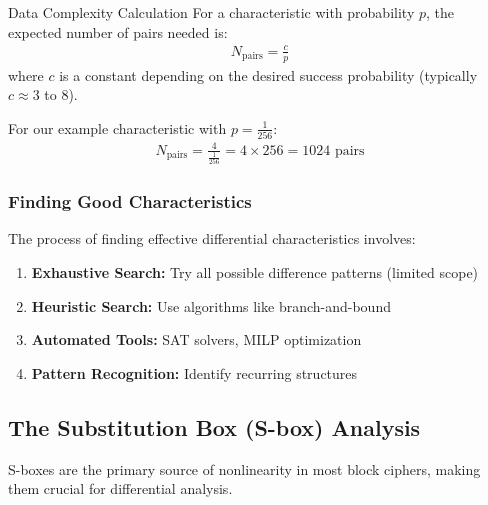 \documentclass[12pt,a4paper]{article}
\theoremstyle{definition}
\begin{document}
\begin{examplebox}{Data Complexity Calculation}
For a characteristic with probability $p$, the expected number of pairs needed is:
\begin{align}
N_{\text{pairs}} = \frac{c}{p}
\end{align}
where $c$ is a constant depending on the desired success probability (typically $c \approx 3$ to $8$).

For our example characteristic with $p = \frac{1}{256}$:
\begin{align}
N_{\text{pairs}} = \frac{4}{\frac{1}{256}} = 4 \times 256 = 1024 \text{ pairs}
\end{align}
\end{examplebox}

\subsubsection{Finding Good Characteristics}

The process of finding effective differential characteristics involves:

\begin{enumerate}
    \item \textbf{Exhaustive Search:} Try all possible difference patterns (limited scope)
    \item \textbf{Heuristic Search:} Use algorithms like branch-and-bound
    \item \textbf{Automated Tools:} SAT solvers, MILP optimization
    \item \textbf{Pattern Recognition:} Identify recurring structures
\end{enumerate}

\subsection{The Substitution Box (S-box) Analysis}

S-boxes are the primary source of nonlinearity in most block ciphers, making them crucial for differential analysis.
\end{document}
